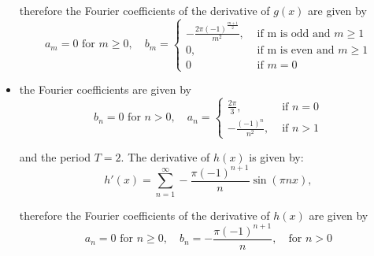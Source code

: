 \documentclass[11pt]{article}
\begin{document}
\begin{solution}
\begin{itemize}
    therefore the Fourier coefficients of the derivative of $g(x)$ are given by 
    \[
    a_m = 0 \text{ for } m \geq 0, \quad b_m = \begin{cases}-\frac{2\pi (-1)^{\frac{m+1}{2}}}{m^2}, & \text { if m is odd and }m \geq 1 \\ 0, & \text{ if m is even and } m \geq 1\\ 0 & \text{ if } m = 0  \end{cases} 
    \]
    \item 
    the Fourier coefficients are given by 
    \[
    b_n = 0 \text{ for } n >0, \quad a_n = \begin{cases}\frac{2\pi}{3}, & \text { if }n = 0 \\ -\frac{(-1)^n}{n^2}, & \text{ if } n > 1 \end{cases} 
    \]

    and the period $T = 2$. The derivative of $h(x)$ is given by:
    \[
    h'(x) =\sum_{n=1}^{\infty} -\frac{\pi(-1)^{n+1}}{n}\sin(\pi n x),
    \]

    therefore the Fourier coefficients of the derivative of $h(x)$ are given by 
    \[
    a_n = 0 \text{ for } n \geq 0, \quad b_n = -\frac{\pi(-1)^{n+1}}{n},\quad \text{for }n > 0
    \]
    \end{itemize}
\end{solution}
\end{document}
